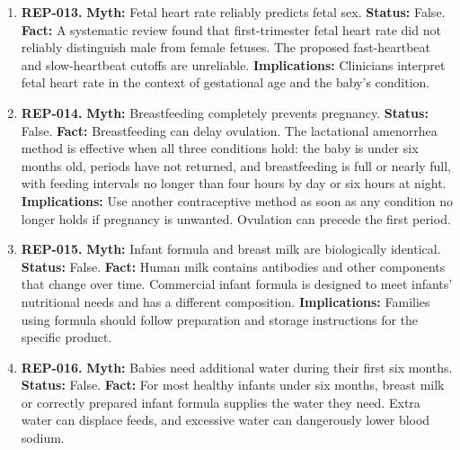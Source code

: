 \documentclass[11pt,oneside]{book}
\begin{document}
\begin{enumerate}[leftmargin=0pt,labelwidth=0pt,labelsep=0pt,itemindent=0pt]
\item[] \textbf{REP-013.} \textbf{Myth:} Fetal heart rate reliably predicts fetal sex.\newline
\textbf{Status:} False.\newline
\textbf{Fact:} A systematic review found that first-trimester fetal heart rate did not reliably distinguish male from female fetuses. The proposed fast-heartbeat and slow-heartbeat cutoffs are unreliable. \cite{ref328}\newline
\textbf{Implications:} Clinicians interpret fetal heart rate in the context of gestational age and the baby's condition.
\item[] \textbf{REP-014.} \textbf{Myth:} Breastfeeding completely prevents pregnancy.\newline
\textbf{Status:} False.\newline
\textbf{Fact:} Breastfeeding can delay ovulation. The lactational amenorrhea method is effective when all three conditions hold: the baby is under six months old, periods have not returned, and breastfeeding is full or nearly full, with feeding intervals no longer than four hours by day or six hours at night. \cite{ref329}\newline
\textbf{Implications:} Use another contraceptive method as soon as any condition no longer holds if pregnancy is unwanted. Ovulation can precede the first period.
\item[] \textbf{REP-015.} \textbf{Myth:} Infant formula and breast milk are biologically identical.\newline
\textbf{Status:} False.\newline
\textbf{Fact:} Human milk contains antibodies and other components that change over time. Commercial infant formula is designed to meet infants' nutritional needs and has a different composition. \cite{ref68,ref330}\newline
\textbf{Implications:} Families using formula should follow preparation and storage instructions for the specific product.
\item[] \textbf{REP-016.} \textbf{Myth:} Babies need additional water during their first six months.\newline
\textbf{Status:} False.\newline
\textbf{Fact:} For most healthy infants under six months, breast milk or correctly prepared infant formula supplies the water they need. Extra water can displace feeds, and excessive water can dangerously lower blood sodium. \cite{ref330,ref256}\newline

\end{enumerate}
\end{document}
